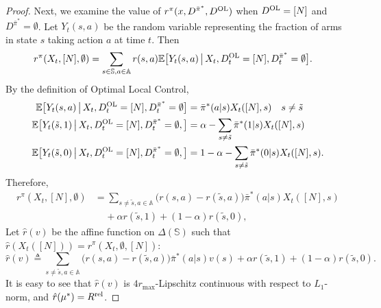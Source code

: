 \documentclass[11pt,letterpaper]{article}
\theoremstyle{plain}
\theoremstyle{definition}
\theoremstyle{remark}
\newcommand{\Ebig}[1]{\mathbb{E}\big[#1\big]}
\newcommand{\givenbig}{\,\big|\,}
\newcommand{\sspa}{\mathbb{S}}
\newcommand{\aspa}{\mathbb{A}}
\newcommand{\sumsa}{\sum_{s\in\sspa, a\in\aspa}}
\newcommand{\rel}{\textup{rel}} %
\newcommand{\rmax}{r_{\max}}
\newcommand{\ravg}{R}
\newcommand{\rrel}{\ravg^\rel}
\newcommand{\pibar}{{\sysbar{\pi}}}
\newcommand{\pibs}{{\pibar^*}}
\newcommand{\sysbar}[1]{\bar{#1}}
\newcommand{\simplex}{\Delta}
\newcommand{\statdist}{\mu^*}
\newcommand{\Da}{D^{\pibs}}
\newcommand{\Db}{D^{\textup{OL}}}
\newcommand{\sneu}{\tilde{s}}
\begin{document}
\begin{proof}
    Next, we examine the value of $r^\pi(x, \Da, \Db)$ when $\Db = [N]$ and $\Da = \emptyset$. Let $Y_t(s,a)$ be the random variable representing the fraction of arms in state $s$ taking action $a$ at time $t$. Then
    \begin{align*}
        r^\pi(X_t, [N], \emptyset) 
        &= \sumsa r(s,a) \Ebig{Y_t(s,a) \givenbig X_t, \Db_t = [N], \Da_t = \emptyset}. 
    \end{align*}
    By the definition of Optimal Local Control, 
    \begin{align}
        \Ebig{Y_t(s,a) \givenbig X_t, \Db_t = [N], \Da_t = \emptyset} &= \pibs(a|s) X_t([N], s) \quad s\neq \sneu \\ 
        \Ebig{Y_t(\sneu,1) \givenbig X_t, \Db_t = [N], \Da_t = \emptyset, } &= \alpha - \sum_{s\neq \sneu} \pibs(1|s) X_t([N], s)  \\
        \Ebig{Y_t(\sneu,0) \givenbig X_t, \Db_t = [N], \Da_t = \emptyset, } &= 1 - \alpha - \sum_{s\neq \sneu} \pibs(0|s) X_t([N], s). 
    \end{align} 
    Therefore,
    \begin{equation}\label{eq:lp-priority-inst-reward}
        \begin{aligned}
        r^\pi(X_t, [N], \emptyset) 
        &= \sum_{s\neq \sneu, a\in\aspa} \big(r(s,a) - r(\sneu,a)\big) \pibs(a|s) X_t([N],s) \\
        &\mspace{20mu} + \alpha r(\sneu,1) + (1-\alpha) r(\sneu,0),
        \end{aligned}
    \end{equation}
    Let $\hat{r}(v)$ be the affine function on $\simplex(\sspa)$ such that $\hat{r}(X_t([N])) = r^\pi(X_t, \emptyset, [N])$: 
    \[
        \hat{r}(v) \triangleq \sum_{s\neq \sneu, a\in\aspa} \big(r(s,a) - r(\sneu,a)\big) \pibs(a|s) v(s) + \alpha r(\sneu,1) + (1-\alpha) r(\sneu,0). 
    \]
    It is easy to see that $\hat{r}(v)$ is $4\rmax$-Lipschitz continuous with respect to $L_1$-norm, and $\hat{r}(\statdist) = \rrel$. 



\end{proof}
\end{document}
